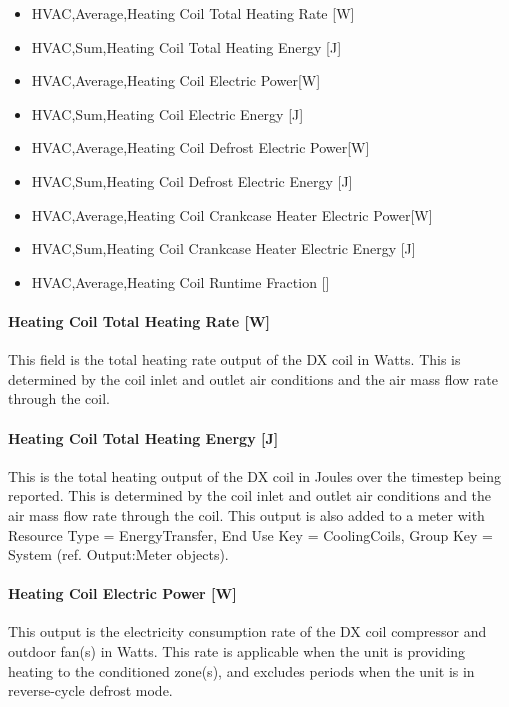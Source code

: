 \begin{itemize}
\item
  HVAC,Average,Heating Coil Total Heating Rate {[}W{]}
\item
  HVAC,Sum,Heating Coil Total Heating Energy {[}J{]}
\item
  HVAC,Average,Heating Coil Electric Power{[}W{]}
\item
  HVAC,Sum,Heating Coil Electric Energy {[}J{]}
\item
  HVAC,Average,Heating Coil Defrost Electric Power{[}W{]}
\item
  HVAC,Sum,Heating Coil Defrost Electric Energy {[}J{]}
\item
  HVAC,Average,Heating Coil Crankcase Heater Electric Power{[}W{]}
\item
  HVAC,Sum,Heating Coil Crankcase Heater Electric Energy {[}J{]}
\item
  HVAC,Average,Heating Coil Runtime Fraction {[]}
\end{itemize}

\paragraph{Heating Coil Total Heating Rate {[}W{]}}\label{heating-coil-total-heating-rate-w-2}

This field is the total heating rate output of the DX coil in Watts. This is determined by the coil inlet and outlet air conditions and the air mass flow rate through the coil.

\paragraph{Heating Coil Total Heating Energy {[}J{]}}\label{heating-coil-total-heating-energy-j-2}

This is the total heating output of the DX coil in Joules over the timestep being reported. This is determined by the coil inlet and outlet air conditions and the air mass flow rate through the coil. This output is also added to a meter with Resource Type = EnergyTransfer, End Use Key = CoolingCoils, Group Key = System (ref. Output:Meter objects).

\paragraph{Heating Coil Electric Power {[}W{]}}\label{heating-coil-electric-power-w-5}

This output is the electricity consumption rate of the DX coil compressor and outdoor fan(s) in Watts. This rate is applicable when the unit is providing heating to the conditioned zone(s), and excludes periods when the unit is in reverse-cycle defrost mode.

